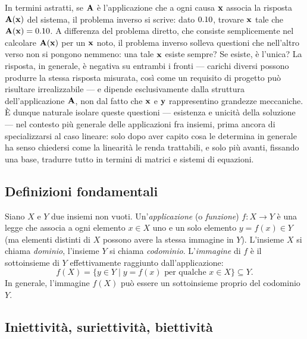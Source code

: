 	In termini astratti, se $\mathbf{A}$ \`e l'applicazione che a ogni causa $\mathbf{x}$ associa la risposta $\mathbf{A}(\mathbf{x})$ del sistema, il problema inverso si scrive: dato $0.10$, trovare $\mathbf{x}$ tale che $\mathbf{A}(\mathbf{x})=0.10$. A differenza del problema diretto, che consiste semplicemente nel calcolare $\mathbf{A}(\mathbf{x})$ per un $\mathbf{x}$ noto, il problema inverso solleva questioni che nell'altro verso non si pongono nemmeno: una tale $\mathbf{x}$ esiste sempre? Se esiste, \`e l'unica? La risposta, in generale, \`e negativa su entrambi i fronti --- carichi diversi possono produrre la stessa risposta misurata, cos\`i come un requisito di progetto pu\`o risultare irrealizzabile --- e dipende esclusivamente dalla struttura dell'applicazione $\mathbf{A}$, non dal fatto che $\mathbf{x}$ e $\mathbf{y}$ rappresentino grandezze meccaniche. \`E dunque naturale isolare queste questioni --- esistenza e unicit\`a della soluzione --- nel contesto pi\`u generale delle applicazioni fra insiemi, prima ancora di specializzarsi al caso lineare: solo dopo aver capito cosa le determina in generale ha senso chiedersi come la linearit\`a le renda trattabili, e solo pi\`u avanti, fissando una base, tradurre tutto in termini di matrici e sistemi di equazioni.

\subsection{Definizioni fondamentali}

Siano $X$ e $Y$ due insiemi non vuoti. Un'\textit{applicazione} (o \textit{funzione}) $f: X \to Y$ \`e una
legge che associa a ogni elemento $x \in X$ uno e un solo elemento 	$y = f(x) \in Y$ (ma elementi distinti di $X$ possono avere la stessa
immagine in $Y$).
L'insieme $X$ si chiama \textit{dominio}, l'insieme $Y$ si chiama \textit{codominio}. L'\textit{immagine} di $f$ \`e il sottoinsieme di $Y$ effettivamente raggiunto dall'applicazione:
\begin{equation}
	f(X) = \{y \in Y \mid y = f(x) \text{ per qualche } x \in X\} \subseteq Y.
\end{equation}
In generale, l'immagine $f(X)$ pu\`o essere un sottoinsieme proprio del codominio $Y$.


\subsection{Iniettivit\`a, suriettivit\`a, biettivit\`a}

